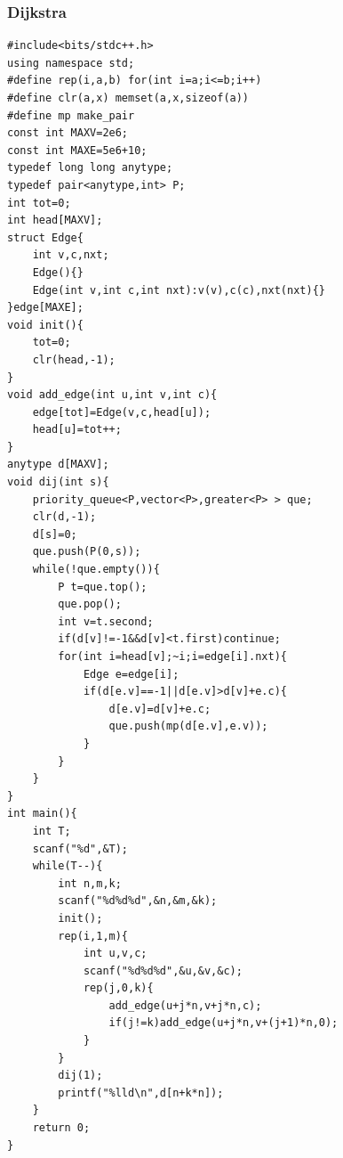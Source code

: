 \documentclass[twoside]{article}
\begin{document}
\subsubsection{Dijkstra}
\begin{lstlisting}
#include<bits/stdc++.h>
using namespace std;
#define rep(i,a,b) for(int i=a;i<=b;i++)
#define clr(a,x) memset(a,x,sizeof(a))
#define mp make_pair
const int MAXV=2e6;
const int MAXE=5e6+10;
typedef long long anytype;
typedef pair<anytype,int> P;
int tot=0;
int head[MAXV];
struct Edge{
    int v,c,nxt;
    Edge(){}
    Edge(int v,int c,int nxt):v(v),c(c),nxt(nxt){}
}edge[MAXE];
void init(){
    tot=0;
    clr(head,-1);
}
void add_edge(int u,int v,int c){
    edge[tot]=Edge(v,c,head[u]);
    head[u]=tot++;
}
anytype d[MAXV];
void dij(int s){
    priority_queue<P,vector<P>,greater<P> > que;
    clr(d,-1);
    d[s]=0;
    que.push(P(0,s));
    while(!que.empty()){
        P t=que.top();
        que.pop();
        int v=t.second;
        if(d[v]!=-1&&d[v]<t.first)continue;
        for(int i=head[v];~i;i=edge[i].nxt){
            Edge e=edge[i];
            if(d[e.v]==-1||d[e.v]>d[v]+e.c){
                d[e.v]=d[v]+e.c;
                que.push(mp(d[e.v],e.v));
            }
        }
    }
}
int main(){
    int T;
    scanf("%d",&T);
    while(T--){
        int n,m,k;
        scanf("%d%d%d",&n,&m,&k);
        init();
        rep(i,1,m){
            int u,v,c;
            scanf("%d%d%d",&u,&v,&c);
            rep(j,0,k){
                add_edge(u+j*n,v+j*n,c);
                if(j!=k)add_edge(u+j*n,v+(j+1)*n,0);
            }
        }
        dij(1);
        printf("%lld\n",d[n+k*n]);
    }
    return 0;
}
\end{lstlisting}
\end{document}
